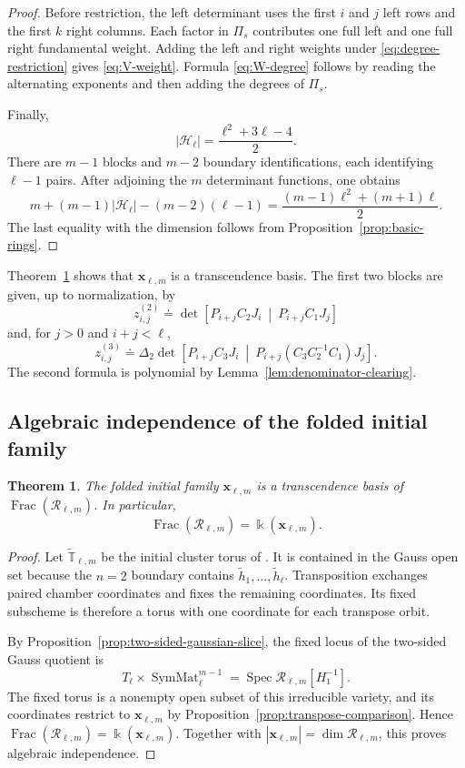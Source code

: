 \documentclass[11pt]{amsart}
\newtheorem{theorem}{Theorem}[section]
\theoremstyle{definition}
\theoremstyle{remark}
\newcommand{\kk}{\Bbbk}
\newcommand{\SymMat}{\operatorname{SymMat}}
\newcommand{\cR}{\mathcal R}
\newcommand{\Frac}{\operatorname{Frac}}
\begin{document}
\begin{proof}
Before restriction, the left determinant uses the first $i$ and $j$ left
rows and the first $k$ right columns.  Each factor in $\Pi_s$
contributes one full left and one full right fundamental weight.  Adding the
left and right weights under \eqref{eq:degree-restriction} gives
\eqref{eq:V-weight}.  Formula \eqref{eq:W-degree} follows by reading the
alternating exponents and then adding the degrees of $\Pi_s$.

Finally,
\[ |\mathscr H_\ell|=\frac{\ell^2+3\ell-4}{2}. \]
There are $m-1$ blocks and $m-2$ boundary identifications, each identifying $\ell-1$ pairs.
After adjoining the $m$ determinant functions, one obtains
\[ m+(m-1)|\mathscr H_\ell|-(m-2)(\ell-1) =\frac{(m-1)\ell^2+(m+1)\ell}{2}. \]
The last equality with the dimension follows from
Proposition~\ref{prop:basic-rings}.
\end{proof}

Theorem~\ref{thm:folded-family-transcendence-basis} shows that
$\mathbf x_{\ell,m}$ is a transcendence basis.  The first two blocks are
given, up to normalization, by
\[ z_{i,j}^{(2)}\doteq \det\left[P_{i+j}C_2J_i\ \middle|\ P_{i+j}C_1J_j\right] \]
and, for $j>0$ and $i+j<\ell$,
\[ z_{i,j}^{(3)}\doteq \Delta_2\det\left[ P_{i+j}C_3J_i\ \middle|\ P_{i+j}(C_3C_2^{-1}C_1)J_j \right]. \]
The second formula is polynomial by Lemma~\ref{lem:denominator-clearing}.

\subsection{Algebraic independence of the folded initial family}
\label{subsec:folded-family-independence}

\begin{theorem}
\label{thm:folded-family-transcendence-basis}
The folded initial family $\mathbf x_{\ell,m}$ is a transcendence basis of
$\Frac(\cR_{\ell,m})$.  In particular,
\[ \Frac(\cR_{\ell,m})=\kk(\mathbf x_{\ell,m}). \]
\end{theorem}

\begin{proof}
Let $\widetilde{\mathbb T}_{\ell,m}$ be the initial cluster torus of
\cite{FeiKroneckerII}.  It is
contained in the Gauss open set because the $n=2$ boundary contains
$\widetilde h_1,\ldots,\widetilde h_\ell$.  Transposition exchanges paired
chamber coordinates and fixes the remaining coordinates.  Its fixed
subscheme is therefore a torus with one coordinate for each transpose
orbit.

By Proposition~\ref{prop:two-sided-gaussian-slice}, the fixed locus of the
two-sided Gauss quotient is
\[ T_\ell\times\SymMat_\ell^{m-1} =\operatorname{Spec}\cR_{\ell,m}[H_1^{-1}]. \]
The fixed torus is a nonempty open subset of this irreducible variety, and
its coordinates restrict to $\mathbf x_{\ell,m}$ by
Proposition~\ref{prop:transpose-comparison}.  Hence
$\Frac(\cR_{\ell,m})=\kk(\mathbf x_{\ell,m}). $
Together with $|\mathbf x_{\ell,m}|=\dim\cR_{\ell,m}$, this proves
algebraic independence.
\end{proof}
\end{document}
